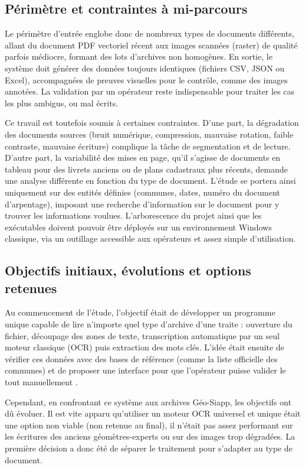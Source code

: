 \documentclass[a4paper,11pt]{article}
\begin{document}
\subsection{Périmètre et contraintes à mi-parcours}

Le périmètre d'entrée englobe donc de nombreux types de documents différents, allant du document PDF vectoriel récent aux images scannées (raster) de qualité parfois médiocre, formant des lots d'archives non homogènes. En sortie, le système doit générer des données toujours identiques (fichiers CSV, JSON ou Excel), accompagnées de preuves visuelles pour le contrôle, comme des images annotées. La validation par un opérateur reste indispensable pour traiter les cas les plus ambigus, ou mal écrits.

Ce travail est toutefois soumis à certaines contraintes. D'une part, la dégradation des documents sources (bruit numérique, compression, mauvaise rotation, faible contraste, mauvaise écriture) complique la tâche de segmentation et de lecture. D'autre part, la variabilité des mises en page, qu'il s'agisse de documents en tableau pour des livrets anciens ou de plans cadastraux plus récents, demande une analyse différente en fonction du type de document. L'étude se portera ainsi uniquement sur des entités définies (communes, dates, numéro du document d'arpentage), imposant une recherche d'information sur le document pour y trouver les informations voulues. L'arborescence du projet ainsi que les exécutables doivent pouvoir être déployés sur un environnement Windows classique, via un outillage accessible aux opérateurs et assez simple d'utilisation.

\subsection{Objectifs initiaux, évolutions et options retenues}
Au commencement de l'étude, l'objectif était de développer un programme unique capable de lire n'importe quel type d'archive d'une traite : ouverture du fichier, découpage des zones de texte, transcription automatique par un seul moteur classique (OCR) puis extraction des mots clés. L'idée était ensuite de vérifier ces données avec des bases de référence (comme la liste officielle des communes) et de proposer une interface pour que l'opérateur puisse valider le tout manuellement \citep{beatrice_challenges_2023, stokes_partage_nodate}.

Cependant, en confrontant ce système aux archives Géo-Siapp, les objectifs ont dû évoluer. Il est vite apparu qu'utiliser un moteur OCR universel et unique était une option non viable (non retenue au final), il n'était pas assez performant sur les écritures des anciens géomètres-experts ou sur des images trop dégradées. La première décision a donc été de séparer le traitement pour s'adapter au type de document.
\end{document}
